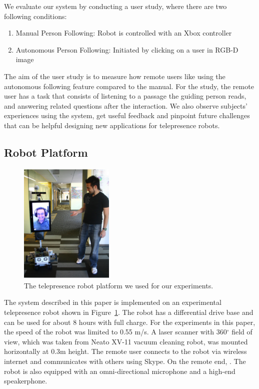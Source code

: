 We evaluate our system by conducting a user study, where there are two following conditions:

\begin{enumerate}
\item Manual Person Following: Robot is controlled with an Xbox controller
\item Autonomous Person Following: Initiated by clicking on a user in RGB-D image
\end{enumerate}

The aim of the user study is to measure how remote users like using the autonomous following feature compared to the manual. For the study, the remote user has a task that consists of listening to a passage the guiding person reads, and answering related questions after the interaction. We also observe subjects' experiences using the system, get useful feedback and pinpoint future challenges that can be helpful designing new applications for telepresence robots.

\subsection{Robot Platform}

\begin{figure}[h!]
\centering
\includegraphics[width=0.4\textwidth]{pics/telepresence_robot}
\caption{The telepresence robot platform we used for our experiments.}
\label{fig:telepresence_robot}
\end{figure}

The system described in this paper is implemented on an experimental telepresence robot shown in Figure~\ref{fig:telepresence_robot}. The robot has a differential drive base and can be used for about 8 hours with full charge. For the experiments in this paper, the speed of the robot was limited to 0.55 m/s. A laser scanner with 360$^{\circ}$ field of view, which was taken from Neato XV-11 vacuum cleaning robot, was mounted horizontally at 0.3m height. The remote user connects to the robot via wireless internet and communicates with others using Skype. On the remote end, . The robot is also equipped with an omni-directional microphone and a high-end speakerphone.

